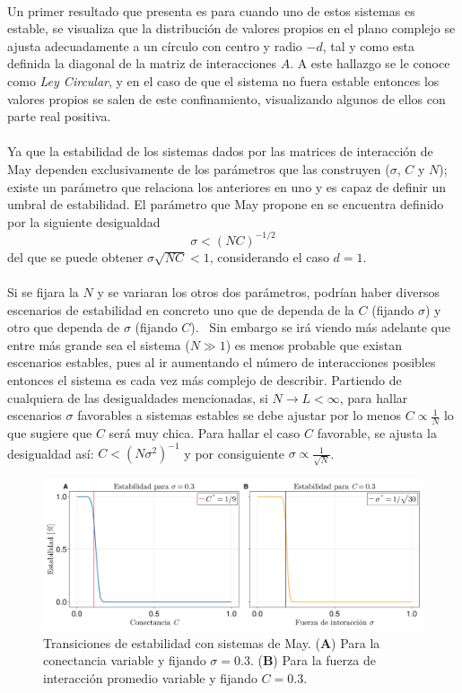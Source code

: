 \\
Un primer resultado que presenta es para cuando uno de estos sistemas es estable, se visualiza que la distribución de valores propios en el plano complejo se ajusta adecuadamente a un círculo con centro y radio $-d$, tal y como esta definida la diagonal de la matriz de interacciones $A$. A este hallazgo se le conoce como \textit{Ley Circular}, y en el caso de que el sistema no fuera estable entonces los valores propios se salen de este confinamiento, visualizando algunos de ellos con parte real positiva.
\\
\\
Ya que la estabilidad de los sistemas dados por las matrices de interacción de May dependen exclusivamente de los parámetros que las construyen ($\sigma$, $C$ y $N$); existe un parámetro que relaciona los anteriores en uno y es capaz de definir un umbral de estabilidad. El parámetro que May propone en \cite{may1972will} se encuentra definido por la siguiente desigualdad 
\begin{equation}\label{eqn:paramMay}
	\sigma<(NC)^{-1/2}
\end{equation}
del que se puede obtener $\sigma\sqrt{NC}<1$, considerando el caso $d=1$.\\
\\
Si se fijara la $N$ y se variaran los otros dos parámetros, podrían haber diversos escenarios de estabilidad en concreto uno que de dependa de la $C$ (fijando $\sigma$) y otro que dependa de $\sigma$ (fijando $C$). \ Sin embargo se irá viendo más adelante que entre más grande sea el sistema ($N\gg1$) es menos probable que existan escenarios estables, pues al ir aumentando el número de interacciones posibles entonces el sistema es cada vez más complejo de describir. Partiendo de cualquiera de las desigualdades mencionadas, si $N\to L<\infty$, para hallar escenarios $\sigma$ favorables a sistemas estables se debe ajustar por lo menos $C\propto\frac{1}{N}$ lo que sugiere que $C$ será muy chica. Para hallar el caso $C$ favorable, se ajusta la desigualdad así: $C<(N\sigma^2)^{-1}$ y por consiguiente $\sigma\propto\frac{1}{\sqrt{N}}$.
\begin{figure}[h!]
	\centering
	\includegraphics[scale=0.16]{../Imagenes/TransicionesdeMay}
	\caption{Transiciones de estabilidad con sistemas de May. (\textbf{A}) Para la conectancia variable y fijando $\sigma=0.3$. (\textbf{B}) Para la fuerza de interacción promedio variable y fijando $C=0.3$.}
	\label{fig:TransicionesdeMay}
\end{figure}

